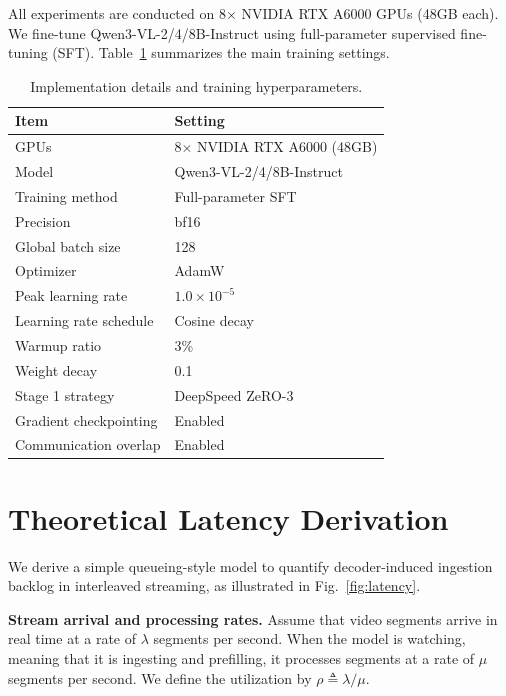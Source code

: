 \documentclass{article}
\begin{document}
All experiments are conducted on 8$\times$ NVIDIA RTX A6000 GPUs (48GB each). We fine-tune Qwen3-VL-2/4/8B-Instruct using full-parameter supervised fine-tuning (SFT). Table~\ref{tab:impl_details} summarizes the main training settings.

\begin{table}[h]
\centering
\caption{Implementation details and training hyperparameters.}
\label{tab:impl_details}
\begin{tabular}{ll}
\toprule
\textbf{Item} & \textbf{Setting} \\
\midrule
GPUs & 8$\times$ NVIDIA RTX A6000 (48GB) \\
Model & Qwen3-VL-2/4/8B-Instruct \\
Training method & Full-parameter SFT \\
Precision & bf16 \\
Global batch size & 128 \\
Optimizer & AdamW \\
Peak learning rate & $1.0\times10^{-5}$ \\
Learning rate schedule & Cosine decay \\
Warmup ratio & 3\% \\
Weight decay & 0.1 \\
Stage 1 strategy & DeepSpeed ZeRO-3 \\
Gradient checkpointing & Enabled \\
Communication overlap & Enabled \\
\bottomrule
\end{tabular}
\end{table}

\section{Theoretical Latency Derivation}
\label{app:latency}

We derive a simple queueing-style model to quantify decoder-induced ingestion backlog in interleaved streaming, as illustrated in Fig.~\ref{fig:latency}.

\noindent\textbf{Stream arrival and processing rates.}
Assume that video segments arrive in real time at a rate of $\lambda$ segments per second. When the model is watching, meaning that it is ingesting and prefilling, it processes segments at a rate of $\mu$ segments per second. We define the utilization by $\rho \triangleq \lambda/\mu$.
\end{document}

